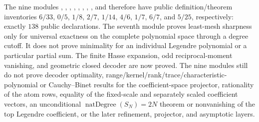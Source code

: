 \documentclass[11pt,oneside]{article}
\theoremstyle{definition}
\theoremstyle{remark}
\begin{document}
The nine modules ,
,
,
,
,
,
,
, and
 therefore have public
definition/theorem inventories $6/33$, $0/5$, $1/8$, $2/7$, $1/14$, $4/6$,
$1/7$, $6/7$, and $5/25$, respectively: exactly $138$ public declarations.
The seventh module proves
least-mesh sharpness only for universal exactness on the complete polynomial
space through a degree cutoff.  It does not prove minimality for an individual
Legendre polynomial or a particular partial sum.  The finite Hasse expansion,
odd reciprocal-moment vanishing, and geometric closed decoder are now proved.
The nine modules still do not prove decoder optimality,
range/kernel/rank/trace/characteristic-polynomial or Cauchy--Binet results for the
coefficient-space projector, rationality of the atom rows, equality of the fixed-scale and separately
scaled coefficient vectors, an unconditional
\(\operatorname{natDegree}(S_N)=2N\) theorem or nonvanishing of the top
Legendre coefficient, or the later refinement, projector, and asymptotic
layers.
\end{document}

